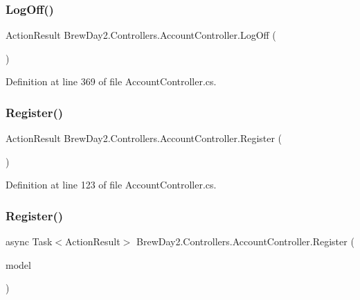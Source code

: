 \subsubsection{\texorpdfstring{Log\+Off()}{LogOff()}}
{\footnotesize\ttfamily Action\+Result Brew\+Day2.\+Controllers.\+Account\+Controller.\+Log\+Off (\begin{DoxyParamCaption}{ }\end{DoxyParamCaption})}



Definition at line 369 of file Account\+Controller.\+cs.

\mbox{\label{class_brew_day2_1_1_controllers_1_1_account_controller_af3f9f544eb4078c5964867d54bc17c75}} 
\subsubsection{\texorpdfstring{Register()}{Register()}\hspace{0.1cm}{\footnotesize\ttfamily [1/2]}}
{\footnotesize\ttfamily Action\+Result Brew\+Day2.\+Controllers.\+Account\+Controller.\+Register (\begin{DoxyParamCaption}{ }\end{DoxyParamCaption})}



Definition at line 123 of file Account\+Controller.\+cs.

\mbox{\label{class_brew_day2_1_1_controllers_1_1_account_controller_a0eccb71c2436cd83f24364fae3cbbe8c}} 
\subsubsection{\texorpdfstring{Register()}{Register()}\hspace{0.1cm}{\footnotesize\ttfamily [2/2]}}
{\footnotesize\ttfamily async Task$<$Action\+Result$>$ Brew\+Day2.\+Controllers.\+Account\+Controller.\+Register (\begin{DoxyParamCaption}\item[{\mbox{\hyperlink{class_brew_day2_1_1_models_1_1_register_view_model}{Register\+View\+Model}}}]{model }\end{DoxyParamCaption})}




